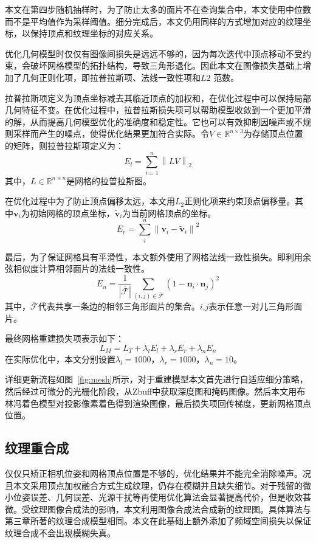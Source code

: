 本文在第四步随机抽样时，为了防止太多的面片不在查询集合中，本文使用中位数而不是平均值作为采样阈值。细分完成后，本文仍用同样的方式增加对应的纹理坐标，以保持顶点和纹理坐标的对应关系。\par
优化几何模型时仅仅有图像间损失是远远不够的，因为每次迭代中顶点移动不受约束，会破坏网格模型的拓扑结构，导致三角形退化。因此本文在图像损失基础上增加了几何正则化项，即拉普拉斯项、法线一致性项和$L2$ 范数。\par
拉普拉斯项定义为顶点坐标减去其临近顶点的加权和，在优化过程中可以保持局部几何特征不变。在优化过程中，拉普拉斯损失项可以帮助模型收敛到一个更加平滑的解，从而提高几何模型优化的准确度和稳定性。它也可以有效抑制因噪声或不规则采样而产生的噪点，使得优化结果更加符合实际。令$V \in \mathbb{R}^{n\times3}$为存储顶点位置的矩阵，则拉普拉斯项定义为：
\begin{equation}
	E_l = \sum_{i=1}^{n}\left \| LV \right \|_2 
\end{equation}
其中，$L\in\mathbb{R}^{n\times n} $是网格的拉普拉斯图。\par
在优化过程中为了防止顶点偏移太远，本文用$L_2$正则化项来约束顶点偏移量。其中$\mathbf{v}_{i}$为初始网格的顶点坐标，$\widetilde{\mathbf{v}}_{i}$为当前网格顶点的坐标。
\begin{equation}
	E_{r}=\sum_{i}^{n}\left\|\mathbf{v}_{i}-\widetilde{\mathbf{v}}_{i}\right\|^{2}
\end{equation}

最后，为了保证网格具有平滑性，本文额外使用了网格法线一致性损失。即利用余弦相似度计算相邻面片的法线一致性。
\begin{equation}
	E_n= \frac{1}{|\overline{\mathcal{F}}|} \sum_{(i, j) \in \overline{\mathcal{F}}}\left(1-\mathbf{n}_{i} \cdot \mathbf{n}_{j}\right)^{2}
\end{equation}
其中，$\overline{\mathcal{F}}$代表共享一条边的相邻三角形面片的集合。$i$,$j$表示任意一对儿三角形面片。\par
最终网格重建损失项表示如下：
\begin{equation}
	L_M = L_T + \lambda_l E_l +\lambda_r E_r+\lambda_n E_n
\end{equation}
在实际优化中，本文分别设置$\lambda_l = 1000$，$\lambda_r = 1000$，$\lambda_n = 10$。\par

详细更新流程如图~\ref{fig:mesh}所示，对于重建模型本文首先进行自适应细分策略，然后经过可微分的光栅化阶段，从Zbuff中获取深度图和掩码图像。然后本文用布林冯着色模型对投影像素着色得到渲染图像，最后损失项回传梯度，更新网格顶点位置。

\subsection{纹理重合成}
仅仅只矫正相机位姿和网格顶点位置是不够的，优化结果并不能完全消除噪声。况且本文采用顶点加权融合方式生成纹理，仍存在模糊并且缺失细节。对于残留的微小位姿误差、几何误差、光源干扰等再使用优化算法会显著提高代价，但是收效甚微。受纹理图像合成法的影响，本文利用图像合成法合成新的纹理图。具体算法与第三章所著的纹理合成模型相同。本文在此基础上额外添加了频域空间损失以保证纹理合成不会出现模糊失真。\par

